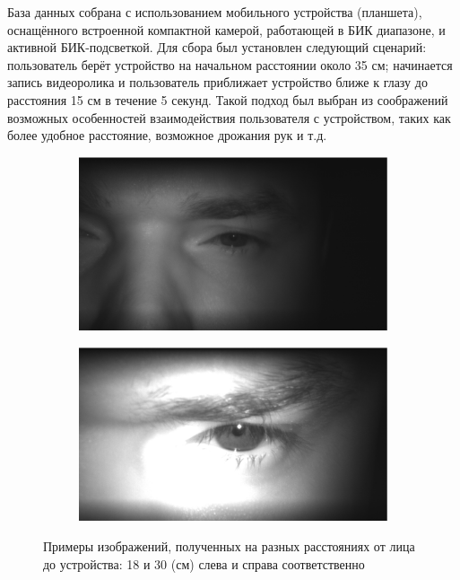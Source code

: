 База данных собрана с использованием мобильного устройства (планшета), оснащённого встроенной компактной камерой, работающей в БИК диапазоне, и активной БИК-подсветкой. Для сбора был установлен следующий сценарий: пользователь берёт устройство на начальном расстоянии около 35 см; начинается запись видеоролика и пользователь приближает устройство ближе к глазу до расстояния 15 см в течение 5 секунд. Такой подход был выбран из соображений возможных особенностей взаимодействия пользователя с устройством, таких как более удобное расстояние, возможное дрожания рук и т.д.

\begin{figure}[!h]
	\centering
	\begin{subfigure}{.475\textwidth}
		\centering
		\includegraphics[width=0.95\columnwidth]{pictures/mobile_db_example_30.eps}
		\label{fig:mobile_db_example_18}
	\end{subfigure}%
	\begin{subfigure}{.475\textwidth}
		\centering
		\includegraphics[width=0.95\columnwidth]{pictures/mobile_db_example_18.eps}
		\label{fig:mobile_db_example_30}
	\end{subfigure}%
	\caption{Примеры изображений, полученных на разных расстояниях от лица до устройства: 18 и 30 (см) слева и справа соответственно}
	\label{fig:mobiel_db_examples}
\end{figure}

